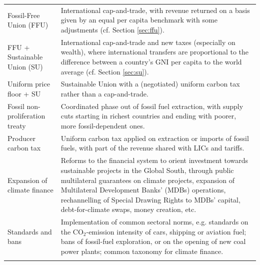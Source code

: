 \documentclass[12pt,english]{article}
\begin{document}
\begin{table}[h]
{\begin{tabular}[t]{P{4cm}P{15cm}}
  Fossil-Free Union (FFU)  & International cap-and-trade, with revenue returned on a basis given by an equal per capita benchmark with some adjustments (cf. Section \ref{sec:ffu}). \\
  FFU + Sustainable Union (SU)  &  International cap-and-trade and new taxes (especially on wealth), where international transfers are proportional to the difference between a country's GNI per capita to the world average (cf. Section \ref{sec:su}). \\
  Uniform price floor + SU  & Sustainable Union with a (negotiated) uniform carbon tax rather than a cap-and-trade. \\
  Fossil non-proliferation treaty\citep{newell_towards_2020,calverley_phaseout_2022} & Coordinated phase out of fossil fuel extraction, with supply cuts starting in richest countries and ending with poorer, more fossil-dependent ones. \\ 
  Producer carbon tax\citep{peszko_cooperative_2019} &  Uniform carbon tax applied on extraction or imports of fossil fuels, with part of the revenue shared with LICs and tariffs. \\
  Expansion of climate finance\citep{songwe_raising_2024,mazzucato_green_2024,bridgetown_bridgetown_2025,hourcade_climate_2025,green_climate_fund_scaling_2021,dafermos_climate_2025}  & Reforms to the financial system to orient investment towards sustainable projects in the Global South, through public multilateral guarantees on climate projects, expansion of Multilateral Development Banks' (MDBs) operations, rechannelling of Special Drawing Rights to MDBs' capital, debt-for-climate swaps, money creation, etc. \\
  Standards and bans &  Implementation of common sectoral norms, e.g. standards on the CO$_\text{2}$-emission intensity of cars, shipping or aviation fuel; bans of fossil-fuel exploration, or on the opening of new coal power plants; common taxonomy for climate finance. \\
  \bottomrule\\[-0.81em]
\end{tabular}}
\end{table}
\end{document}
